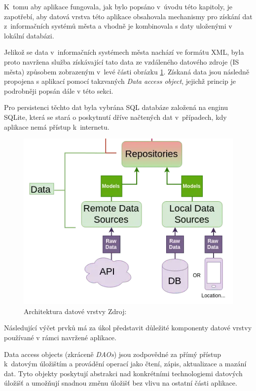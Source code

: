 K~tomu aby aplikace fungovala, jak bylo popsáno v~úvodu této kapitoly, je zapotřebí, aby datová vrstva této aplikace obsahovala mechanismy pro
 získání dat z~informačních systémů města a vhodně je kombinovala s daty uloženými v lokální databázi.
 
Jelikož se data v~informačních systémech města nachází ve formátu XML, byla proto navržena služba získávající tato data ze vzdáleného 
datového zdroje (IS města) způsobem zobrazeným v~levé části obrázku \ref{fig:arch_data_layer}. Získaná data jsou následně propojena s aplikací
pomocí takzvaných \textit{Data access object}, jejichž princip je podrobněji popsán dále v této sekci.

Pro persistenci těchto dat byla vybrána SQL databáze založená na enginu SQLite, která se stará o poskytnutí dříve načtených dat 
v~případech, kdy aplikace nemá přístup k~internetu.


\begin{figure}[H]
  \centering
  \includegraphics[width=.5\textwidth]{data_layer_diagram.png}
  \caption{Architektura datové vrstvy Zdroj: \cite{imgDataFlow}}
  \label{fig:arch_data_layer}
\end{figure}


Následující výčet prvků má za úkol představit důležité komponenty datové vrstvy používané v rámci navržené aplikace.

Data access objects (zkráceně \textit{DAOs}) jsou zodpovědné za přímý přístup k~datovým úložištím a provádění operací jako čtení, zápis, aktualizace a mazání dat. \cite{oracleDAO} Tyto objekty 
poskytují abstrakci nad konkrétními technologiemi datových úložišť a umožňují snadnou změnu úložišť bez vlivu na ostatní části aplikace.

